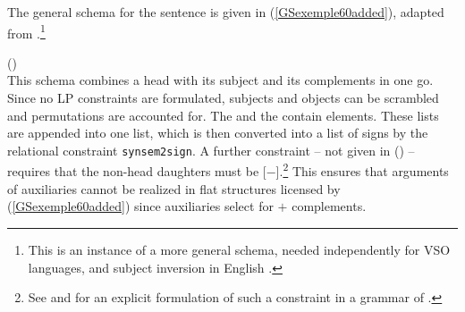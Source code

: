 The general schema for the sentence is given in (\ref{GSexemple60added}), adapted from
.\footnote{This is an instance of a more general schema, needed independently
  for VSO languages, and subject inversion in English \parencites[]{ps2}[231--232]{GSag2000a-u}.}

\ea
\label{GSexemple60added}
 () \impl \\
\z
This schema combines a head with its subject and its complements in one go. Since no LP constraints
are formulated, subjects and objects can be scrambled and permutations are accounted for. The \subjl and the
\compsl contain  elements. These lists are appended into one list, which is then
converted into a list of signs by the
relational constraint \texttt{synsem2sign}. A further constraint -- not given in () -- requires that the
non-head daughters must be [\light{}$-$].\footnote{%
  See \citet[]{Mueller2005c} and \citet[Section~2.2.4]{MuellerGS} for an explicit formulation of
  such a constraint in a grammar of .
} This ensures that arguments of auxiliaries cannot be realized
in flat structures licensed by (\ref{GSexemple60added}) since auxiliaries select for \light{}$+$
complements. 

